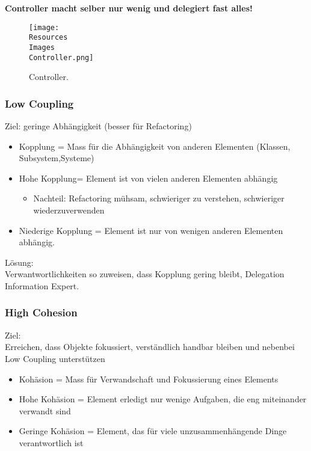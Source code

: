 \documentclass[../ZF_SWEN1.tex]{subfiles}
\begin{document}
{{\textbf{{\large Controller macht selber nur wenig und delegiert fast alles!}}

\begin{figure} [H]
\centering
\texttt{[image: \\Resources\\Images\\Controller.png]}
\caption{\label{fig:Controller}Controller.}

\end{figure}


\subsubsection{Low Coupling}

Ziel: geringe Abhängigkeit (besser für Refactoring)
\begin{itemize}
	\item Kopplung = Mass für die Abhängigkeit von anderen Elementen (Klassen, Subsystem,Systeme)
	\item Hohe Kopplung= Element ist von vielen anderen Elementen abhängig
	\begin{itemize}
		\item Nachteil: Refactoring mühsam, schwieriger zu verstehen, schwieriger wiederzuverwenden
		
	\end{itemize}
	\item Niederige Kopplung = Element ist nur von wenigen anderen Elementen abhängig.
\end{itemize}


Lösung:\\
Verwantwortlichkeiten so zuweisen, dass Kopplung gering bleibt, Delegation Information Expert.

\subsubsection{High Cohesion}

Ziel:\\
Erreichen, dass Objekte fokussiert, verständlich handbar bleiben und nebenbei Low Coupling unterstützen

\begin{itemize}
	\item Kohäsion = Mass für Verwandschaft und Fokussierung eines Elements
	\item Hohe Kohäsion = Element erledigt nur wenige Aufgaben, die eng miteinander verwandt sind
	\item Geringe Kohäsion = Element, das für viele unzusammenhängende Dinge verantwortlich ist
\end{itemize}

}}
\end{document}
